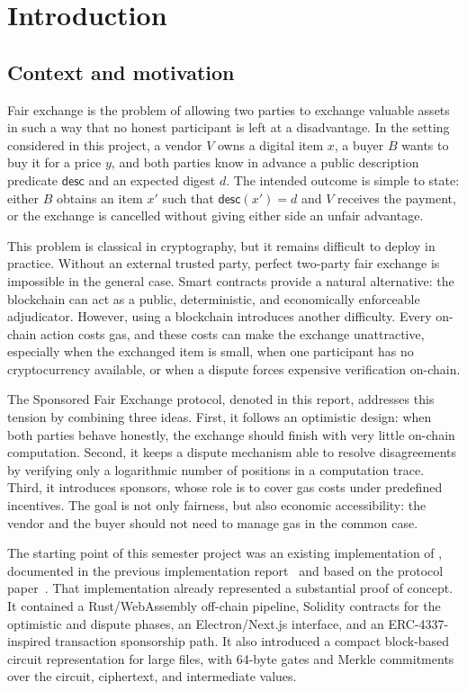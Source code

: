 \chapter{Introduction}

\section{Context and motivation}

Fair exchange is the problem of allowing two parties to exchange valuable assets in such a
way that no honest participant is left at a disadvantage. In the setting considered in this
project, a vendor \(V\) owns a digital item \(x\), a buyer \(B\) wants to buy it for a price
\(y\), and both parties know in advance a public description predicate \(\mathsf{desc}\) and
an expected digest \(d\). The intended outcome is simple to state: either \(B\) obtains an
item \(x'\) such that \(\mathsf{desc}(x') = d\) and \(V\) receives the payment, or the exchange
is cancelled without giving either side an unfair advantage.

This problem is classical in cryptography, but it remains difficult to deploy in practice.
Without an external trusted party, perfect two-party fair exchange is impossible in the
general case. Smart contracts provide a natural alternative: the blockchain can act as a
public, deterministic, and economically enforceable adjudicator. However, using a blockchain
introduces another difficulty. Every on-chain action costs gas, and these costs can make the
exchange unattractive, especially when the exchanged item is small, when one participant has
no cryptocurrency available, or when a dispute forces expensive verification on-chain.

The Sponsored Fair Exchange protocol, denoted \sox{} in this report, addresses this tension
by combining three ideas. First, it follows an optimistic design: when both parties behave
honestly, the exchange should finish with very little on-chain computation. Second, it keeps
a dispute mechanism able to resolve disagreements by verifying only a logarithmic number of
positions in a computation trace. Third, it introduces sponsors, whose role is to cover gas
costs under predefined incentives. The goal is not only fairness, but also economic
accessibility: the vendor and the buyer should not need to manage gas in the common case.

The starting point of this semester project was an existing implementation of \sox{},
documented in the previous implementation report~\cite{hana2025} and based on the
protocol paper~\cite{sox2026}. That implementation already represented a substantial
proof of concept. It contained a Rust/WebAssembly off-chain pipeline, Solidity contracts for
the optimistic and dispute phases, an Electron/Next.js interface, and an ERC-4337-inspired
transaction sponsorship path. It also introduced a compact block-based circuit representation
for large files, with 64-byte gates and Merkle commitments over the circuit, ciphertext, and
intermediate values.

